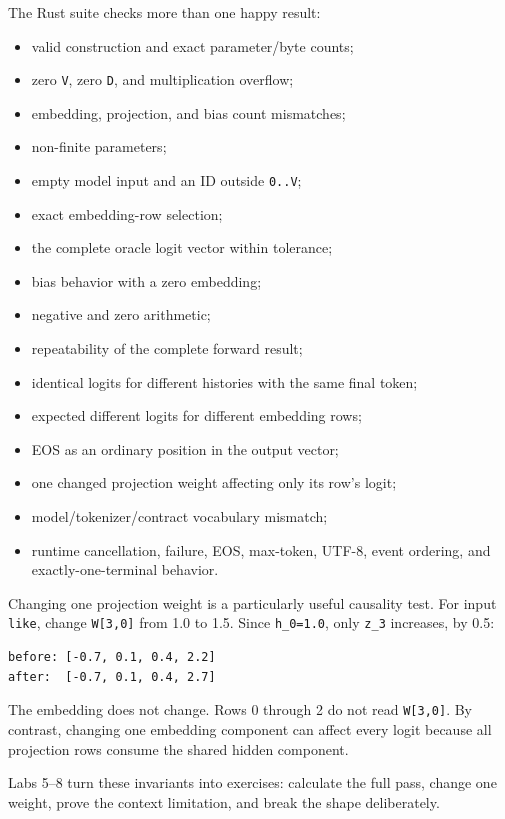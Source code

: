 The Rust suite checks more than one happy result:

\begin{itemize}
\tightlist
\item
  valid construction and exact parameter/byte counts;
\item
  zero \texttt{V}, zero \texttt{D}, and multiplication overflow;
\item
  embedding, projection, and bias count mismatches;
\item
  non-finite parameters;
\item
  empty model input and an ID outside \texttt{0..V};
\item
  exact embedding-row selection;
\item
  the complete oracle logit vector within tolerance;
\item
  bias behavior with a zero embedding;
\item
  negative and zero arithmetic;
\item
  repeatability of the complete forward result;
\item
  identical logits for different histories with the same final token;
\item
  expected different logits for different embedding rows;
\item
  EOS as an ordinary position in the output vector;
\item
  one changed projection weight affecting only its row's logit;
\item
  model/tokenizer/contract vocabulary mismatch;
\item
  runtime cancellation, failure, EOS, max-token, UTF-8, event ordering,
  and exactly-one-terminal behavior.
\end{itemize}

Changing one projection weight is a particularly useful causality test.
For input \texttt{like}, change \texttt{W{[}3,0{]}} from 1.0 to 1.5.
Since \texttt{h\_0=1.0}, only \texttt{z\_3} increases, by 0.5:

\begin{verbatim}
before: [-0.7, 0.1, 0.4, 2.2]
after:  [-0.7, 0.1, 0.4, 2.7]
\end{verbatim}

The embedding does not change. Rows 0 through 2 do not read
\texttt{W{[}3,0{]}}. By contrast, changing one embedding component can
affect every logit because all projection rows consume the shared hidden
component.

Labs 5--8 turn these invariants into exercises: calculate the full pass,
change one weight, prove the context limitation, and break the shape
deliberately.

